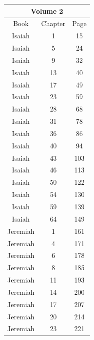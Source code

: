 \documentclass{article}
\newlength{\minipageheight}
\newlength{\minipagewidth}
\begin{document}
\begin{minipage}[r][\minipageheight][t]{\minipagewidth}%
    \begin{center}
        \renewcommand{\arraystretch}{1.0}
        \begin{tabular}{|c|c|c|}
            \hline
            \multicolumn{3}{|c|}{Volume 2} \\
            \hline
            Book     & Chapter & Page      \\
            \hline
            Isaiah   & 1       & 15        \\
            Isaiah   & 5       & 24        \\
            Isaiah   & 9       & 32        \\
            Isaiah   & 13      & 40        \\
            Isaiah   & 17      & 49        \\
            Isaiah   & 23      & 59        \\
            Isaiah   & 28      & 68        \\
            Isaiah   & 31      & 78        \\
            Isaiah   & 36      & 86        \\
            Isaiah   & 40      & 94        \\
            Isaiah   & 43      & 103       \\
            Isaiah   & 46      & 113       \\
            Isaiah   & 50      & 122       \\
            Isaiah   & 54      & 130       \\
            Isaiah   & 59      & 139       \\
            Isaiah   & 64      & 149       \\
            Jeremiah & 1       & 161       \\
            Jeremiah & 4       & 171       \\
            Jeremiah & 6       & 178       \\
            Jeremiah & 8       & 185       \\
            Jeremiah & 11      & 193       \\
            Jeremiah & 14      & 200       \\
            Jeremiah & 17      & 207       \\
            Jeremiah & 20      & 214       \\
            Jeremiah & 23      & 221       \\

\end{tabular}
\end{center}
\end{minipage}
\end{document}
